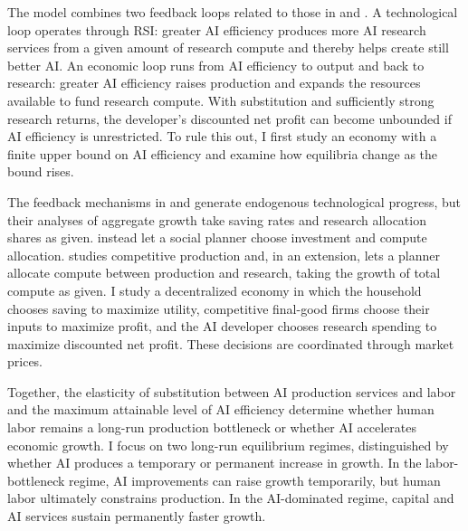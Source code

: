 The model combines two feedback loops related to those in \citet{davidsonetal2026} and \citet{jonestonetti2026}. A technological loop operates through RSI: greater AI efficiency produces more AI research services from a given amount of research compute and thereby helps create still better AI. An economic loop runs from AI efficiency to output and back to research: greater AI efficiency raises production and expands the resources available to fund research compute. With substitution and sufficiently strong research returns, the developer's discounted net profit can become unbounded if AI efficiency is unrestricted. To rule this out, I first study an economy with a finite upper bound on AI efficiency and examine how equilibria change as the bound rises.

The feedback mechanisms in \citet{davidsonetal2026} and
\citet{jonestonetti2026} generate endogenous technological progress,
but their analyses of aggregate growth take saving rates and research
allocation shares as given. \citet{erdiletal2025gate} instead let a
social planner choose investment and compute allocation.
\citet{restrepo2025agi} studies competitive production and, in an extension,
lets a planner allocate compute between production and research, taking
the growth of total compute as given. I study a
decentralized economy in which the household chooses saving to maximize
utility, competitive final-good firms choose their inputs to maximize
profit, and the AI developer chooses research spending to maximize
discounted net profit. These decisions are coordinated through market
prices.


Together, the elasticity of substitution between AI production services and labor and the maximum attainable level of AI efficiency determine whether human labor remains a long-run production bottleneck or whether AI accelerates economic growth. I focus on two long-run equilibrium regimes, distinguished by whether AI produces a temporary or permanent increase in growth. In the labor-bottleneck regime, AI improvements can raise growth temporarily, but human labor ultimately constrains production. In the AI-dominated regime, capital and AI services sustain permanently faster growth.

